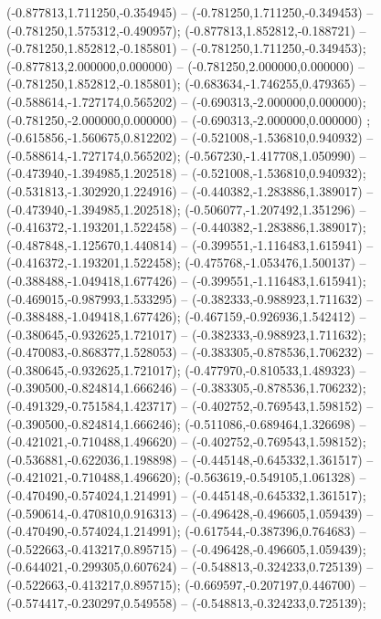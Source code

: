  (-0.877813,1.711250,-0.354945) -- (-0.781250,1.711250,-0.349453) -- (-0.781250,1.575312,-0.490957);
 (-0.877813,1.852812,-0.188721) -- (-0.781250,1.852812,-0.185801) -- (-0.781250,1.711250,-0.349453);
 (-0.877813,2.000000,0.000000) -- (-0.781250,2.000000,0.000000) -- (-0.781250,1.852812,-0.185801);
 (-0.683634,-1.746255,0.479365) -- (-0.588614,-1.727174,0.565202) -- (-0.690313,-2.000000,0.000000);
 (-0.781250,-2.000000,0.000000) -- (-0.690313,-2.000000,0.000000) ;
 (-0.615856,-1.560675,0.812202) -- (-0.521008,-1.536810,0.940932) -- (-0.588614,-1.727174,0.565202);
 (-0.567230,-1.417708,1.050990) -- (-0.473940,-1.394985,1.202518) -- (-0.521008,-1.536810,0.940932);
 (-0.531813,-1.302920,1.224916) -- (-0.440382,-1.283886,1.389017) -- (-0.473940,-1.394985,1.202518);
 (-0.506077,-1.207492,1.351296) -- (-0.416372,-1.193201,1.522458) -- (-0.440382,-1.283886,1.389017);
 (-0.487848,-1.125670,1.440814) -- (-0.399551,-1.116483,1.615941) -- (-0.416372,-1.193201,1.522458);
 (-0.475768,-1.053476,1.500137) -- (-0.388488,-1.049418,1.677426) -- (-0.399551,-1.116483,1.615941);
 (-0.469015,-0.987993,1.533295) -- (-0.382333,-0.988923,1.711632) -- (-0.388488,-1.049418,1.677426);
 (-0.467159,-0.926936,1.542412) -- (-0.380645,-0.932625,1.721017) -- (-0.382333,-0.988923,1.711632);
 (-0.470083,-0.868377,1.528053) -- (-0.383305,-0.878536,1.706232) -- (-0.380645,-0.932625,1.721017);
 (-0.477970,-0.810533,1.489323) -- (-0.390500,-0.824814,1.666246) -- (-0.383305,-0.878536,1.706232);
 (-0.491329,-0.751584,1.423717) -- (-0.402752,-0.769543,1.598152) -- (-0.390500,-0.824814,1.666246);
 (-0.511086,-0.689464,1.326698) -- (-0.421021,-0.710488,1.496620) -- (-0.402752,-0.769543,1.598152);
 (-0.536881,-0.622036,1.198898) -- (-0.445148,-0.645332,1.361517) -- (-0.421021,-0.710488,1.496620);
 (-0.563619,-0.549105,1.061328) -- (-0.470490,-0.574024,1.214991) -- (-0.445148,-0.645332,1.361517);
 (-0.590614,-0.470810,0.916313) -- (-0.496428,-0.496605,1.059439) -- (-0.470490,-0.574024,1.214991);
 (-0.617544,-0.387396,0.764683) -- (-0.522663,-0.413217,0.895715) -- (-0.496428,-0.496605,1.059439);
 (-0.644021,-0.299305,0.607624) -- (-0.548813,-0.324233,0.725139) -- (-0.522663,-0.413217,0.895715);
 (-0.669597,-0.207197,0.446700) -- (-0.574417,-0.230297,0.549558) -- (-0.548813,-0.324233,0.725139);
